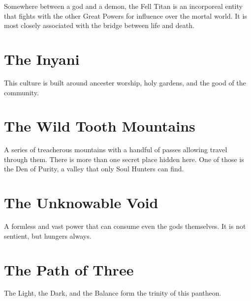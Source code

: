\begin{multicols}{2}
Somewhere between a god and a demon, the Fell Titan is an incorporeal
entity that fights with the other Great Powers for influence over the
mortal world. It is most closely associated with the bridge between life
and death.

\section{The Inyani}

This culture is built around ancester worship, holy gardens, and the
good of the community.

\section{The Wild Tooth Mountains}

A series of treacherous mountains with a handful of passes allowing
travel through them. There is more than one secret place hidden here.
One of those is the Den of Purity, a valley that only Soul Hunters
can find.

\section{The Unknowable Void}

A formless and vast power that can consume even the gods themselves. It
is not sentient, but hungers always.

\section{The Path of Three}

The Light, the Dark, and the Balance form the trinity of this pantheon.

\end{multicols}
